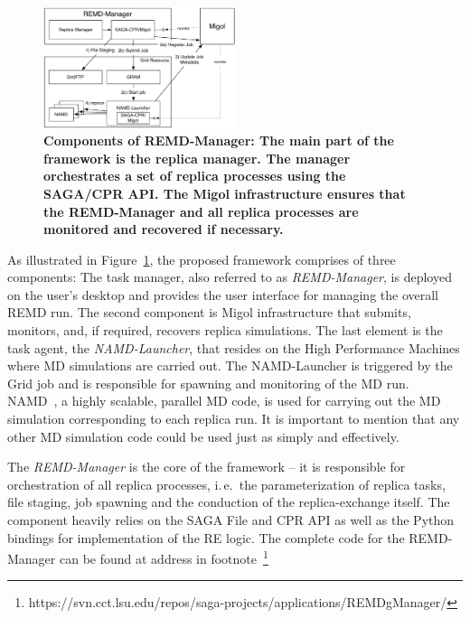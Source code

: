 \documentclass[conference,final]{IEEEtran}
\newcommand{\up}{\vspace*{-1em}}
\begin{document}
\begin{figure}[ht]
      \centering
          \includegraphics[width=0.5\textwidth]{REMDgManager-architecture.pdf}
          \up\up
          \caption{\small \bf Components of REMD-Manager: The main part of the
            framework is the replica manager. The manager orchestrates
            a set of replica processes using the SAGA/CPR API. The
            Migol infrastructure ensures that the REMD-Manager and all
            replica processes are monitored and recovered if
            necessary.}
            \up\up
      \label{fig:REMD-Manager-architecture}
\end{figure}
As illustrated in Figure~\ref{fig:REMD-Manager-architecture}, the
proposed framework comprises of three components: The task manager,
also referred to as \emph{REMD-Manager}, is deployed on the user's
desktop and provides the user interface for managing the overall REMD
run. The second component is Migol infrastructure that submits,
monitors, and, if required, recovers replica simulations.  The last
element is the task agent, the \emph{NAMD-Launcher}, that resides on
the High Performance Machines where MD simulations are carried
out. The NAMD-Launcher is triggered by the Grid job and is responsible
for spawning and monitoring of the MD
run. NAMD~\cite{Phillips:2005gd}, a highly scalable, parallel MD code,
is used for carrying out the MD simulation corresponding to each
replica run. It is important to mention that any other MD simulation
code could be used just as simply and effectively.


The \emph{REMD-Manager} is the core of the framework -- it is
responsible for orchestration of all replica processes, i.\,e.\ the
parameterization of replica tasks, file staging, job spawning and the
conduction of the replica-exchange itself. The component heavily
relies on the SAGA File and CPR API as well as the Python bindings for
implementation of the RE logic.  The complete code for the
REMD-Manager can be found at address in footnote~\footnote{
 https://svn.cct.lsu.edu/repos/saga-projects/applications/REMDgManager/}
\end{document}
